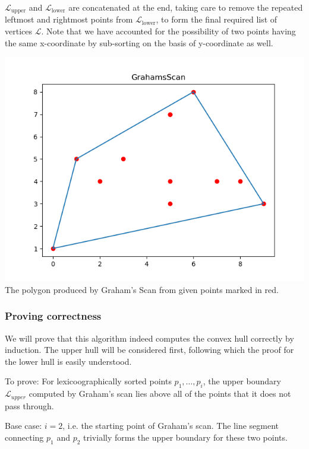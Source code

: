 \documentclass{article}
\begin{document}
$\mathcal{L}_{\text{upper}}$ and $\mathcal{L}_{\text{lower}}$ are concatenated at the end, taking care to remove the repeated leftmost and rightmost points from $\mathcal{L}_{\text{lower}}$, to form the final required list of vertices $\mathcal{L}$. Note that we have accounted for the possibility of two points having the same x-coordinate by sub-sorting on the basis of y-coordinate as well. 

\begin{center}
    \includegraphics[scale=0.54]{GrahamsScan}\\
    \tiny{The polygon produced by Graham's Scan from given points marked in red.}
\end{center}

\subsubsection{Proving correctness}

We will prove that this algorithm indeed computes the convex hull correctly by induction. The upper hull will be considered first, following which the proof for the lower hull is easily understood.

To prove: For lexicoographically sorted points $p_1, \ldots, p_i$, the upper boundary $\mathcal{L}_{upper}$ computed by Graham's scan lies above all of the points that it does not pass through.

Base case: $i=2$, i.e. the starting point of Graham's scan. The line segment connecting $p_1$ and $p_2$ trivially forms the upper boundary for these two points. 
\end{document}
